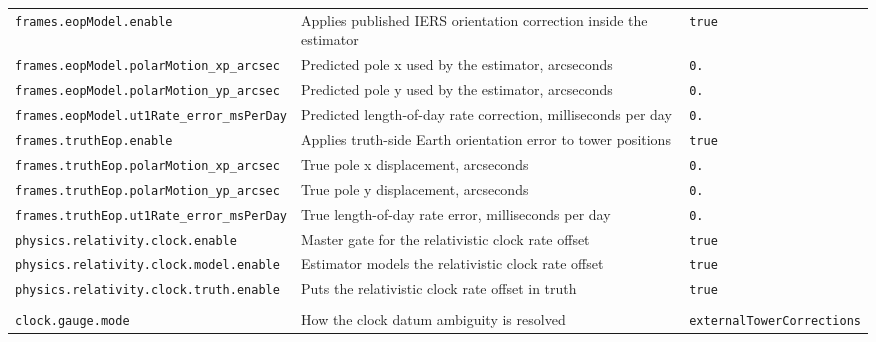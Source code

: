 \begin{center}
\begin{longtable}{>{\raggedright\arraybackslash\scriptsize\ttfamily}p{}|>{\raggedright\arraybackslash}p{}|>{\raggedright\arraybackslash\scriptsize\ttfamily}p{}}
\texttt{frames.\allowbreak eop\allowbreak Model.\allowbreak enable} & Applies published IERS orientation correction inside the estimator & \texttt{true} \\
\texttt{frames.\allowbreak eop\allowbreak Model.\allowbreak polar\allowbreak Motion\_\allowbreak xp\_\allowbreak arcsec} & Predicted pole x used by the estimator, arcseconds & \texttt{0.\allowbreak 1497} \\
\texttt{frames.\allowbreak eop\allowbreak Model.\allowbreak polar\allowbreak Motion\_\allowbreak yp\_\allowbreak arcsec} & Predicted pole y used by the estimator, arcseconds & \texttt{0.\allowbreak 3497} \\
\texttt{frames.\allowbreak eop\allowbreak Model.\allowbreak ut1\allowbreak Rate\_\allowbreak error\_\allowbreak ms\allowbreak Per\allowbreak Day} & Predicted length-of-day rate correction, milliseconds per day & \texttt{0.\allowbreak 04} \\
\texttt{frames.\allowbreak truth\allowbreak Eop.\allowbreak enable} & Applies truth-side Earth orientation error to tower positions & \texttt{true} \\
\texttt{frames.\allowbreak truth\allowbreak Eop.\allowbreak polar\allowbreak Motion\_\allowbreak xp\_\allowbreak arcsec} & True pole x displacement, arcseconds & \texttt{0.\allowbreak 15} \\
\texttt{frames.\allowbreak truth\allowbreak Eop.\allowbreak polar\allowbreak Motion\_\allowbreak yp\_\allowbreak arcsec} & True pole y displacement, arcseconds & \texttt{0.\allowbreak 35} \\
\texttt{frames.\allowbreak truth\allowbreak Eop.\allowbreak ut1\allowbreak Rate\_\allowbreak error\_\allowbreak ms\allowbreak Per\allowbreak Day} & True length-of-day rate error, milliseconds per day & \texttt{0.\allowbreak 05} \\
\texttt{physics.\allowbreak relativity.\allowbreak clock.\allowbreak enable} & Master gate for the relativistic clock rate offset & \texttt{true} \\
\texttt{physics.\allowbreak relativity.\allowbreak clock.\allowbreak model.\allowbreak enable} & Estimator models the relativistic clock rate offset & \texttt{true} \\
\texttt{physics.\allowbreak relativity.\allowbreak clock.\allowbreak truth.\allowbreak enable} & Puts the relativistic clock rate offset in truth & \texttt{true} \\
\hline
\multicolumn{3}{l}{\textbf{Clocks}} \\ \hline
\texttt{clock.\allowbreak gauge.\allowbreak mode} & How the clock datum ambiguity is resolved & \texttt{external\allowbreak Tower\allowbreak Corrections} \\

\end{longtable}
\end{center}
